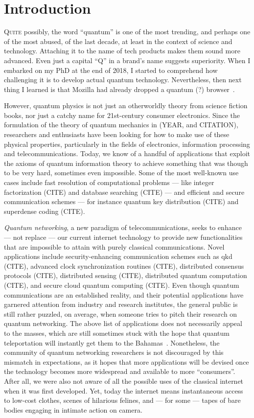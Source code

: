 \chapter{Introduction}
\label{chp:intro}

\lettrine{Q}{uite} possibly, the word ``quantum'' is one of the most trending, and perhaps one of
the most abused, of the last decade, at least in the context of science and technology. Attaching it
to the name of tech products makes them sound more advanced. Even just a capital ``Q'' in a brand's
name suggests superiority. When I embarked on my PhD at the end of 2018, I started to comprehend how
challenging it is to develop actual quantum technology. Nevertheless, then next thing I learned is
that Mozilla had already dropped a quantum (?) browser~\cite{firefox_quantum}.

However, quantum physics is not just an otherworldly theory from science fiction books, nor just a
catchy name for 21st-century consumer electronics. Since the formulation of the theory of quantum
mechanics in (YEAR, and CITATION), researchers and enthusiasts have been looking for how to make use
of these physical properties, particularly in the fields of electronics, information processing and
telecommunications. Today, we know of a handful of applications that exploit the axioms of quantum
information theory to achieve something that was though to be very hard, sometimes even impossible.
Some of the most well-known use cases include fast resolution of computational problems --- like
integer factorization (CITE) and database searching (CITE) --- and efficient and secure
communication schemes --- for instance quantum key distribution (CITE) and superdense coding (CITE).

\emph{Quantum networking}, a new paradigm of telecommunications, seeks to enhance --- not replace
--- our current internet technology to provide new functionalities that are impossible to attain
with purely classical communications. Novel applications include security-enhancing communication
schemes such as \acrfull{qkd} (CITE), advanced clock synchronization routines (CITE), distributed
consensus protocols (CITE), distributed sensing (CITE), distributed quantum computation (CITE), and
secure cloud quantum computing (CITE). Even though quantum communications are an established
reality, and their potential applications have garnered attention from industry and research
institutes, the general public is still rather puzzled, on average, when someone tries to pitch
their research on quantum networking. The above list of applications does not necessarily appeal to
the masses, which are still sometimes stuck with the hope that quantum teleportation will instantly
get them to the Bahamas~\cite{xkcd_teleportation}. Nonetheless, the community of quantum networking
researchers is not discouraged by this mismatch in expectations, as it hopes that more applications
will be devised once the technology becomes more widespread and available to more ``consumers''.
After all, we were also not aware of all the possible uses of the classical internet when it was
first developed. Yet, today the internet means instantaneous access to low-cost clothes, scenes of
hilarious felines, and --- for some --- tapes of bare bodies engaging in intimate action on camera.

